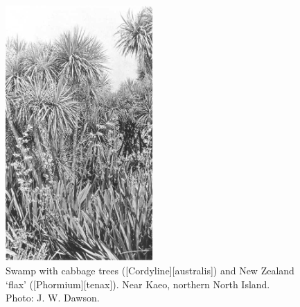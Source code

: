 \begin{figure}
	\includegraphics[width=0.5\textwidth]{graphics/figure66cabbagetree.jpg}
	\centering
	\caption[Swamp with cabbage trees]{Swamp with cabbage trees ([Cordyline][australis]) and New Zealand `flax' ([Phormium][tenax]). Near Kaeo, northern North Island.
	Photo: J. W. Dawson.}%
	\label{fig:66cabbagetree}
\end{figure}

